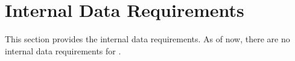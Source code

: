 \KNEADSECTIONNEWPAGE
\section{Internal Data Requirements}
\label{lab:sec_InternalData}
% 

This section provides the internal data requirements. As of now, there are no internal data requirements for \ThisSys.



% 



% 

